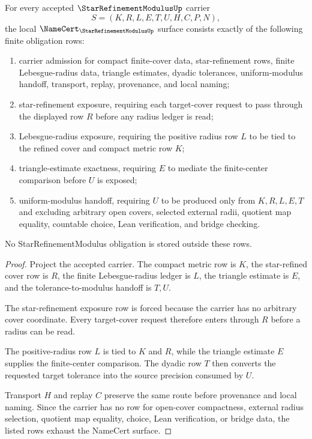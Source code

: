 \begin{theorem}\label{thm:star-refinement-modulus-namecert-obligations}
For every accepted $\StarRefinementModulusUp$ carrier
$$
S=(K,R,L,E,T,U,H,C,P,N),
$$
the local $\NameCert_{\StarRefinementModulusUp}$ surface consists exactly of the following finite obligation rows:
\begin{enumerate}
\item carrier admission for compact finite-cover data, star-refinement rows, finite Lebesgue-radius data, triangle estimates, dyadic tolerances, uniform-modulus handoff, transport, replay, provenance, and local naming;
\item star-refinement exposure, requiring each target-cover request to pass through the displayed row $R$ before any radius ledger is read;
\item Lebesgue-radius exposure, requiring the positive radius row $L$ to be tied to the refined cover and compact metric row $K$;
\item triangle-estimate exactness, requiring $E$ to mediate the finite-center comparison before $U$ is exposed;
\item uniform-modulus handoff, requiring $U$ to be produced only from $K,R,L,E,T$ and excluding arbitrary open covers, selected external radii, quotient map equality, countable choice, Lean verification, and bridge checking.
\end{enumerate}
No StarRefinementModulus obligation is stored outside these rows.
\end{theorem}
\begin{proof}
Project the accepted carrier. The compact metric row is $K$, the star-refined cover row is $R$, the finite Lebesgue-radius ledger is $L$, the triangle estimate is $E$, and the tolerance-to-modulus handoff is $T,U$.

The star-refinement exposure row is forced because the carrier has no arbitrary cover coordinate. Every target-cover request therefore enters through $R$ before a radius can be read.

The positive-radius row $L$ is tied to $K$ and $R$, while the triangle estimate $E$ supplies the finite-center comparison. The dyadic row $T$ then converts the requested target tolerance into the source precision consumed by $U$.

Transport $H$ and replay $C$ preserve the same route before provenance and local naming. Since the carrier has no row for open-cover compactness, external radius selection, quotient map equality, choice, Lean verification, or bridge data, the listed rows exhaust the NameCert surface.
\end{proof}


